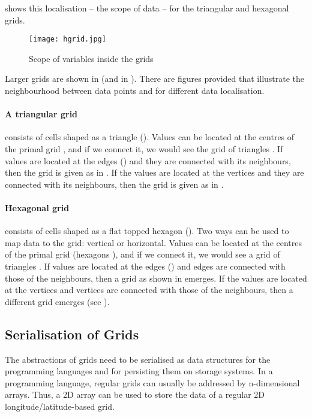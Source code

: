  shows this localisation -- the scope of data -- for the triangular and hexagonal grids.

\begin{figure}[tb]
  \centering
  \texttt{[image: hgrid.jpg]}
  \caption{Scope of variables inside the grids}
  \label{fig:grid}
\end{figure}

Larger grids are shown in  (and in ).
There are figures provided that illustrate the neighbourhood between data points and for different data localisation.

\paragraph{A triangular grid} consists of cells shaped as a triangle ().
Values can be located at the centres of the primal grid , and if we connect it, we would see the grid of triangles .
If values are located at the edges () and they are connected with its neighbours, then the grid is given as in .
If the values are located at the vertices and they are connected with its neighbours, then the grid is given as in .

\paragraph{Hexagonal grid} consists of cells shaped as a flat topped hexagon ().
Two ways can be used to map data to the grid: vertical or horizontal.
Values can be located at the centres of the primal grid (hexagons ), and if we connect it, we would see a grid of triangles .
If values are located at the edges () and edges are connected with those of the neighbours, then a grid as shown in  emerges.
If the values are located at the vertices and vertices are connected with those of the neighbours, then a different grid emerges (see ).


\subsection{Serialisation of Grids}
The abstractions of grids need to be serialised as data structures for the programming languages and for persisting them on storage systems.
In a programming language, regular grids can usually be addressed by n-dimensional arrays.
Thus, a 2D array can be used to store the data of a regular 2D longitude/latitude-based grid.

